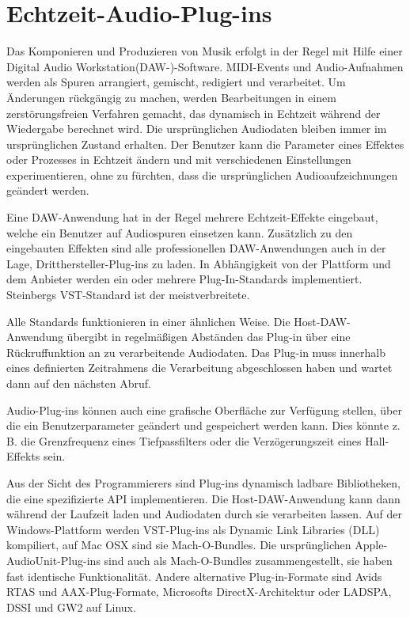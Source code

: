 \section{Echtzeit-Audio-Plug-ins}

Das Komponieren und Produzieren von Musik erfolgt in der Regel mit Hilfe einer Digital Audio Workstation(DAW-)-Software. MIDI-Events und Audio-Aufnahmen werden als Spuren arrangiert, gemischt, redigiert und verarbeitet. Um Änderungen rückgängig zu machen, werden Bearbeitungen in einem zerstörungsfreien Verfahren gemacht, das dynamisch in Echtzeit während der Wiedergabe berechnet wird. Die ursprünglichen Audiodaten bleiben immer im ursprünglichen Zustand erhalten. Der Benutzer kann die Parameter eines Effektes oder Prozesses in Echtzeit ändern und mit verschiedenen Einstellungen experimentieren, ohne zu fürchten, dass die ursprünglichen Audioaufzeichnungen geändert werden.

Eine DAW-Anwendung hat in der Regel mehrere Echtzeit-Effekte eingebaut, welche ein Benutzer auf Audiospuren einsetzen kann. Zusätzlich zu den eingebauten Effekten sind alle professionellen DAW-Anwendungen auch in der Lage, Dritthersteller-Plug-ins zu laden. In Abhängigkeit von der Plattform und dem Anbieter werden ein oder mehrere Plug-In-Standards implementiert. Steinbergs VST-Standard ist der meistverbreitete.

Alle Standards funktionieren in einer ähnlichen Weise. Die Host-DAW-Anwendung übergibt in regelmäßigen Abständen das Plug-in über eine Rückruffunktion an zu verarbeitende Audiodaten. Das Plug-in muss innerhalb eines definierten Zeitrahmens die Verarbeitung abgeschlossen haben und wartet dann auf den nächsten Abruf.

Audio-Plug-ins können auch eine grafische Oberfläche zur Verfügung stellen, über die ein Benutzerparameter geändert und gespeichert werden kann. Dies könnte z. B. die Grenzfrequenz eines Tiefpassfilters oder die Verzögerungszeit eines Hall-Effekts sein.

Aus der Sicht des Programmierers sind Plug-ins dynamisch ladbare Bibliotheken, die eine spezifizierte API implementieren. Die Host-DAW-Anwendung kann dann  während der Laufzeit laden und Audiodaten durch sie verarbeiten lassen. Auf der Windows-Plattform werden VST-Plug-ins als Dynamic Link Libraries (DLL) kompiliert, auf Mac OSX sind sie Mach-O-Bundles. Die  ursprünglichen Apple-AudioUnit-Plug-ins sind auch als Mach-O-Bundles zusammengestellt, sie haben fast identische Funktionalität. Andere alternative Plug-in-Formate sind Avids RTAS und AAX-Plug-Formate, Microsofts DirectX-Architektur oder LADSPA, DSSI und GW2 auf Linux.


